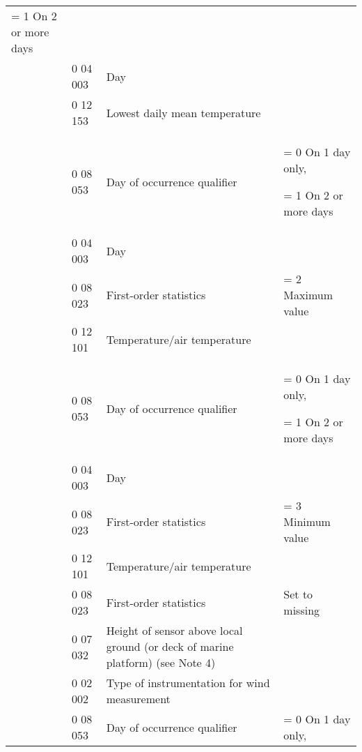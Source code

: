 \begin{longtable}[]{@{}llll@{}}
\begin{minipage}[t]{0.22\columnwidth}
= 1 On 2 or more days\strut
\end{minipage}\tabularnewline
& 0 04 003 & Day &\tabularnewline
& 0 12 153 & Lowest daily mean temperature &\tabularnewline
\begin{minipage}[t]{0.22\columnwidth}\raggedright
\strut
\end{minipage} & \begin{minipage}[t]{0.22\columnwidth}\raggedright
0 08 053\strut
\end{minipage} & \begin{minipage}[t]{0.22\columnwidth}\raggedright
Day of occurrence qualifier\strut
\end{minipage} & \begin{minipage}[t]{0.22\columnwidth}\raggedright
= 0 On 1 day only,

= 1 On 2 or more days\strut
\end{minipage}\tabularnewline
& 0 04 003 & Day &\tabularnewline
& 0 08 023 & First-order statistics & = 2 Maximum value\tabularnewline
& 0 12 101 & Temperature/air temperature &\tabularnewline
\begin{minipage}[t]{0.22\columnwidth}\raggedright
\strut
\end{minipage} & \begin{minipage}[t]{0.22\columnwidth}\raggedright
0 08 053\strut
\end{minipage} & \begin{minipage}[t]{0.22\columnwidth}\raggedright
Day of occurrence qualifier\strut
\end{minipage} & \begin{minipage}[t]{0.22\columnwidth}\raggedright
= 0 On 1 day only,

= 1 On 2 or more days\strut
\end{minipage}\tabularnewline
& 0 04 003 & Day &\tabularnewline
& 0 08 023 & First-order statistics & = 3 Minimum value\tabularnewline
& 0 12 101 & Temperature/air temperature &\tabularnewline
& 0 08 023 & First-order statistics & Set to missing\tabularnewline
& 0 07 032 & Height of sensor above local ground (or deck of marine platform) (see Note 4) &\tabularnewline
& 0 02 002 & Type of instrumentation for wind measurement &\tabularnewline
\begin{minipage}[t]{0.22\columnwidth}\raggedright
\strut
\end{minipage} & \begin{minipage}[t]{0.22\columnwidth}\raggedright
0 08 053\strut
\end{minipage} & \begin{minipage}[t]{0.22\columnwidth}\raggedright
Day of occurrence qualifier\strut
\end{minipage} & \begin{minipage}[t]{0.22\columnwidth}\raggedright
= 0 On 1 day only,


\end{minipage}
\end{longtable}
